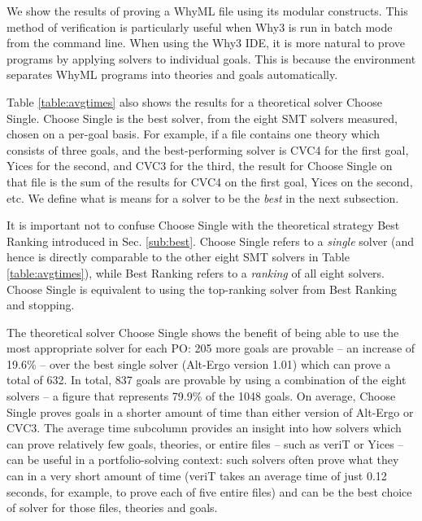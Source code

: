 We show the results of proving a WhyML file using its modular constructs. 
This method of verification is particularly useful when \textsf{Why3} is run in batch mode from the command line.
When using the \textsf{Why3} IDE, it is more natural to prove programs by applying solvers to individual goals.
This is because the environment separates WhyML programs into theories and goals automatically.

Table \ref{table:avgtimes} also shows the results for a theoretical solver \textsf{Choose Single}. 
\textsf{Choose Single} is the best solver, from the eight SMT solvers measured, chosen on a per-goal basis. 
For example, if a file contains one theory which consists of three goals, and the best-performing solver is CVC4 for the first goal, Yices for the second, and CVC3 for the third, the result for \textsf{Choose Single} on that file is the sum of the results for CVC4 on the first goal, Yices on the second, etc.
We define what is means for a solver to be the \textit{best} in the next subsection.

It is important not to confuse \textsf{Choose Single} with the theoretical strategy \textsf{Best Ranking} introduced in Sec. \ref{sub:best}. 
\textsf{Choose Single} refers to a \textit{single} solver (and hence is directly comparable to the other eight SMT solvers in Table \ref{table:avgtimes}), while \textsf{Best Ranking} refers to a \textit{ranking} of all eight solvers. \textsf{Choose Single} is equivalent to using the top-ranking solver from \textsf{Best Ranking} and stopping.

The theoretical solver \textsf{Choose Single} shows the benefit of being able to use the most appropriate solver for each PO: 205 more goals are provable -- an increase of 19.6\% -- over the best single solver (Alt-Ergo version 1.01) which can prove a total of 632. 
In total, 837 goals are provable by using a combination of the eight solvers -- a figure that represents 79.9\% of the 1048 goals. 
On average, \textsf{Choose Single} proves goals in a shorter amount of time than either version of Alt-Ergo or CVC3. 
The average time subcolumn provides an insight into how solvers which can prove relatively few goals, theories, or entire files -- such as veriT or Yices -- can be useful in a portfolio-solving context: such solvers often prove what they can in a very short amount of time (veriT takes an average time of just 0.12 seconds, for example, to prove each of five entire files) and can be the best choice of solver for those files, theories and goals. 

